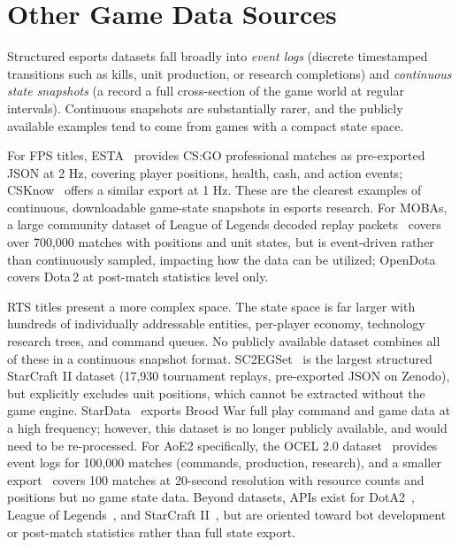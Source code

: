 \section{Other Game Data Sources}

Structured esports datasets fall broadly into \textit{event logs} (discrete timestamped transitions such as kills, unit production, or research completions) and \textit{continuous state snapshots} (a record a full cross-section of the game world at regular intervals). Continuous snapshots are substantially rarer, and the publicly available examples tend to come from games with a compact state space.

For FPS titles, ESTA~\cite{xenopoulos2022} provides CS:GO professional matches as pre-exported JSON at 2 Hz, covering player positions, health, cash, and action events; CSKnow~\cite{durst2022} offers a similar export at 1 Hz. These are the clearest examples of continuous, downloadable game-state snapshots in esports research. For MOBAs, a large community dataset of League of Legends decoded replay packets~\cite{maknee2024} covers over 700,000 matches with positions and unit states, but is event-driven rather than continuously sampled, impacting how the data can be utilized; OpenDota~\cite{opendota} covers Dota\,2 at post-match statistics level only.

RTS titles present a more complex space. The state space is far larger with hundreds of individually addressable entities, per-player economy, technology research trees, and command queues. No publicly available dataset combines all of these in a continuous snapshot format. SC2EGSet~\cite{sc2egset2023} is the largest structured StarCraft II dataset (17,930 tournament replays, pre-exported JSON on Zenodo), but explicitly excludes unit positions, which cannot be extracted without the game engine. StarData~\cite{synnaeve2017} exports Brood War full play command and game data at a high frequency; however, this dataset is no longer publicly available, and would need to be re-processed. For AoE2 specifically, the OCEL 2.0 dataset~\cite{aoe2ocel2024} provides event logs for 100,000 matches (commands, production, research), and a smaller export~\cite{aoerecinfo} covers 100 matches at 20-second resolution with resource counts and positions but no game state data. Beyond datasets, APIs exist for DotA2~\cite{valve,barot2017}, League of Legends~\cite{riotgames}, and StarCraft II~\cite{blizzard}, but are oriented toward bot development or post-match statistics rather than full state export.

